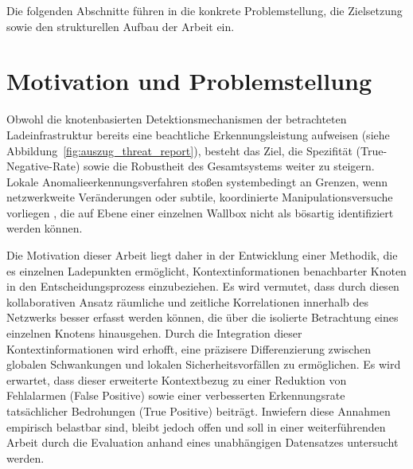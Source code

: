 Die folgenden Abschnitte führen in die konkrete Problemstellung, die Zielsetzung sowie den strukturellen Aufbau der Arbeit ein.

\section{Motivation und Problemstellung}
Obwohl die knotenbasierten Detektionsmechanismen der betrachteten Ladeinfrastruktur bereits eine beachtliche Erkennungsleistung aufweisen (siehe Abbildung~\ref{fig:auszug_threat_report}), besteht das Ziel, die Spezifität (True-Negative-Rate) sowie die Robustheit des Gesamtsystems weiter zu steigern. Lokale Anomalieerkennungsverfahren stoßen systembedingt an Grenzen, wenn netzwerkweite Veränderungen oder subtile, koordinierte Manipulationsversuche vorliegen \cite{lo2022egraphsage}, die auf Ebene einer einzelnen Wallbox nicht als bösartig identifiziert werden können.

Die Motivation dieser Arbeit liegt daher in der Entwicklung einer Methodik, die es einzelnen Ladepunkten ermöglicht, Kontextinformationen benachbarter Knoten in den Entscheidungsprozess einzubeziehen. Es wird vermutet, dass durch diesen kollaborativen Ansatz räumliche und zeitliche Korrelationen innerhalb des Netzwerks besser erfasst werden können, die über die isolierte Betrachtung eines einzelnen Knotens hinausgehen. Durch die Integration dieser Kontextinformationen wird erhofft, eine präzisere Differenzierung zwischen globalen Schwankungen und lokalen Sicherheitsvorfällen zu ermöglichen. Es wird erwartet, dass dieser erweiterte Kontextbezug zu einer Reduktion von Fehlalarmen (False Positive) sowie einer verbesserten Erkennungsrate tatsächlicher Bedrohungen (True Positive) beiträgt. Inwiefern diese Annahmen empirisch belastbar sind, bleibt jedoch offen und soll in einer weiterführenden Arbeit durch die Evaluation anhand eines unabhängigen Datensatzes untersucht werden.